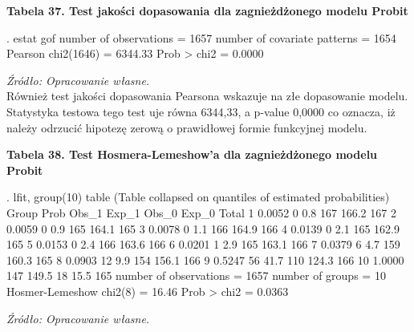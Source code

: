 \vspace{0.5cm}
\textbf{Tabela 37. Test jakości dopasowania dla zagnieżdżonego modelu Probit}
\begin{stlog}
. estat gof
{\smallskip}
{}
{\smallskip}
       number of observations =      1657
 number of covariate patterns =      1654
           Pearson chi2(1646) =      6344.33
                  Prob > chi2 =         0.0000
\end{stlog}
\textit{\footnotesize{Źródło: Opracowanie własne.}} \\

Również test jakości dopasowania Pearsona wskazuje na złe dopasowanie modelu. Statystyka testowa tego test uje równa 6344,33, a p-value 0,0000 co oznacza, iż należy odrzucić hipotezę zerową o prawidłowej formie funkcyjnej modelu.

\vspace{0.5cm}
\textbf{Tabela 38. Test Hosmera-Lemeshow'a dla zagnieżdżonego modelu Probit}
\begin{stlog}
. lfit, group(10) table
{\smallskip}
{}
{\smallskip}
  (Table collapsed on quantiles of estimated probabilities)
  {\TLC}
  {\VBAR} Group {\VBAR}   Prob {\VBAR} Obs_1 {\VBAR} Exp_1 {\VBAR} Obs_0 {\VBAR} Exp_0 {\VBAR} Total {\VBAR}
  {\LFTT}
  {\VBAR}     1 {\VBAR} 0.0052 {\VBAR}     0 {\VBAR}   0.8 {\VBAR}   167 {\VBAR} 166.2 {\VBAR}   167 {\VBAR}
  {\VBAR}     2 {\VBAR} 0.0059 {\VBAR}     0 {\VBAR}   0.9 {\VBAR}   165 {\VBAR} 164.1 {\VBAR}   165 {\VBAR}
  {\VBAR}     3 {\VBAR} 0.0078 {\VBAR}     0 {\VBAR}   1.1 {\VBAR}   166 {\VBAR} 164.9 {\VBAR}   166 {\VBAR}
  {\VBAR}     4 {\VBAR} 0.0139 {\VBAR}     0 {\VBAR}   2.1 {\VBAR}   165 {\VBAR} 162.9 {\VBAR}   165 {\VBAR}
  {\VBAR}     5 {\VBAR} 0.0153 {\VBAR}     0 {\VBAR}   2.4 {\VBAR}   166 {\VBAR} 163.6 {\VBAR}   166 {\VBAR}
  {\LFTT}
  {\VBAR}     6 {\VBAR} 0.0201 {\VBAR}     1 {\VBAR}   2.9 {\VBAR}   165 {\VBAR} 163.1 {\VBAR}   166 {\VBAR}
  {\VBAR}     7 {\VBAR} 0.0379 {\VBAR}     6 {\VBAR}   4.7 {\VBAR}   159 {\VBAR} 160.3 {\VBAR}   165 {\VBAR}
  {\VBAR}     8 {\VBAR} 0.0903 {\VBAR}    12 {\VBAR}   9.9 {\VBAR}   154 {\VBAR} 156.1 {\VBAR}   166 {\VBAR}
  {\VBAR}     9 {\VBAR} 0.5247 {\VBAR}    56 {\VBAR}  41.7 {\VBAR}   110 {\VBAR} 124.3 {\VBAR}   166 {\VBAR}
  {\VBAR}    10 {\VBAR} 1.0000 {\VBAR}   147 {\VBAR} 149.5 {\VBAR}    18 {\VBAR}  15.5 {\VBAR}   165 {\VBAR}
  {\BLC}
{\smallskip}
       number of observations =      1657
             number of groups =        10
      Hosmer-Lemeshow chi2(8) =        16.46
                  Prob > chi2 =         0.0363
\end{stlog}
\textit{\footnotesize{Źródło: Opracowanie własne.}} \\

